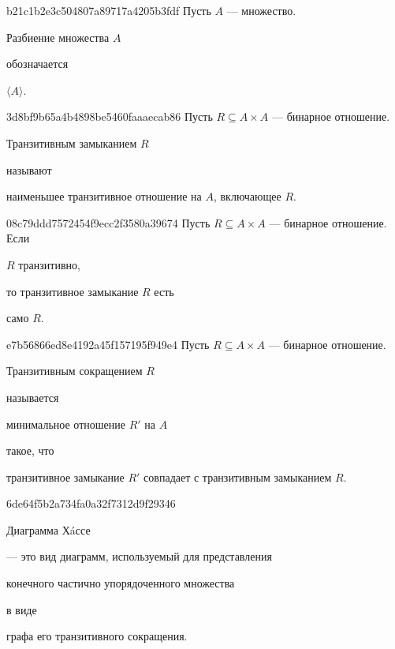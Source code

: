 \begin{note}{b21c1b2e3c504807a89717a4205b3fdf}
    Пусть \({ A }\) --- множество.
    \begin{icloze}{2}Разбиение множества \({ A }\)\end{icloze} обозначается \begin{icloze}{1}\({ \langle A \rangle }\).\end{icloze}
\end{note}

\begin{note}{3d8bf9b65a4b4898be5460faaaecab86}
    Пусть \({ R \subseteq A \times A }\) --- бинарное отношение.
    \begin{icloze}{2}Транзитивным замыканием \({ R }\)\end{icloze} называют \begin{icloze}{1}наименьшее транзитивное отношение на \({ A }\), включающее \({ R }\).\end{icloze}
\end{note}

\begin{note}{08c79ddd7572454f9ecc2f3580a39674}
    Пусть \({ R \subseteq A \times A }\) --- бинарное отношение.
    Если \begin{icloze}{2}\({ R }\) транзитивно,\end{icloze} то транзитивное замыкание \({ R }\) есть \begin{icloze}{1}само \({ R }\).\end{icloze}
\end{note}

\begin{note}{e7b56866ed8e4192a45f157195f949e4}
    Пусть \({ R \subseteq A \times A }\) --- бинарное отношение.
    \begin{icloze}{3}Транзитивным сокращением \({ R }\)\end{icloze} называется \begin{icloze}{2}минимальное отношение \({ R' }\) на \({ A }\)\end{icloze} такое, что \begin{icloze}{1}транзитивное замыкание \({ R' }\) совпадает с транзитивным замыканием \({ R }\).\end{icloze}
\end{note}

\begin{note}{6de64f5b2a734fa0a32f7312d9f29346}
    \begin{icloze}{3}Диаграмма Хáссе\end{icloze} --- это вид диаграмм, используемый для представления \begin{icloze}{1}конечного частично упорядоченного множества\end{icloze} в виде \begin{icloze}{2}графа его транзитивного сокращения.\end{icloze}
\end{note}


